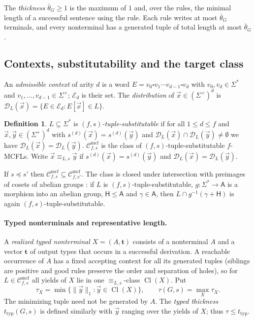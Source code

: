 \documentclass[11pt]{article}
\numberwithin{equation}{section}
\theoremstyle{plain}
\theoremstyle{definition}
\newtheorem{definition}[theorem]{Definition}
\theoremstyle{remark}
\theoremstyle{plain}
\newcommand{\Cmcf}[2]{\mathcal{C}^{\mathrm{mcf}}_{#1,#2}}
\newcommand{\D}{\mathcal{D}}
\newcommand{\E}{\mathcal{E}}
\newcommand{\tuple}[1]{\vec{#1}}
\newcommand{\blank}{\square}
\newcommand{\ttyp}{t_{\mathrm{typ}}}
\newcommand{\bth}{\bar\theta}
\begin{document}
The \emph{thickness} $\bth_G\ge1$ is the maximum of $1$ and, over the rules,
the minimal length of a successful sentence using the rule.  Each rule writes
at most $\bth_G$ terminals, and every nonterminal has a generated tuple of
total length at most $\bth_G$.

\subsection{Contexts, substitutability and the target class}

An \emph{admissible context} of arity $d$ is a word
$E=v_0\blank v_1\cdots v_{d-1}\blank v_d$ with $v_0,v_d\in\Sigma^*$ and
$v_1,\ldots,v_{d-1}\in\Sigma^+$; $\E_d$ is their set.  The \emph{distribution}
of $\tuple x\in(\Sigma^+)^d$ is $\D_L(\tuple x)=\{E\in\E_d:E[\tuple x]\in L\}$.

\begin{definition}
\label{def:class}
$L\subseteq\Sigma^*$ is \emph{$(f,s)$-tuple-substitutable} if for all $1\le
d\le f$ and $\tuple x,\tuple y\in(\Sigma^+)^d$ with $s^{(d)}(\tuple
x)=s^{(d)}(\tuple y)$ and $\D_L(\tuple x)\cap\D_L(\tuple y)\ne\emptyset$ we have
$\D_L(\tuple x)=\D_L(\tuple y)$.  $\Cmcf{f}{s}$ is the class of
$(f,s)$-tuple-substitutable $f$-MCFLs.  Write $\tuple x\equiv_{L,s}\tuple y$ if
$s^{(d)}(\tuple x)=s^{(d)}(\tuple y)$ and $\D_L(\tuple x)=\D_L(\tuple y)$.
\end{definition}

If $s\preceq s'$ then $\Cmcf{f}{s}\subseteq\Cmcf{f}{s'}$.  The class is closed
under intersection with preimages of cosets of abelian groups
\cite[Prop.~\textit{abelian-coset-filter}]{KuriyamaCompendium}: if $L$ is
$(f,s)$-tuple-substitutable, $g:\Sigma^*\to\mathsf A$ is a morphism into an
abelian group, $\mathsf H\le\mathsf A$ and $\gamma\in\mathsf A$, then
$L\cap g^{-1}(\gamma+\mathsf H)$ is again $(f,s)$-tuple-substitutable.

\paragraph{Typed nonterminals and representative length.}
A \emph{realized typed nonterminal} $X=(A,\mathbf t)$ consists of a nonterminal
$A$ and a vector $\mathbf t$ of output types that occurs in a successful
derivation.  A reachable occurrence of $A$ has a fixed accepting context for
all its generated tuples (siblings are positive and good rules preserve the
order and separation of holes), so for $L\in\Cmcf{f}{s}$ all yields of $X$ lie
in one $\equiv_{L,s}$-class $\operatorname{Cl}(X)$.  Put
\[
  \tau_X=\min\{\|\tuple y\|_1:\tuple y\in\operatorname{Cl}(X)\},\qquad
  \tau(G,s)=\max_X\tau_X .
\]
The minimizing tuple need not be generated by $A$.  The \emph{typed thickness}
$\ttyp(G,s)$ is defined similarly with $\tuple y$ ranging over the yields of
$X$; thus $\tau\le\ttyp$.
\end{document}
